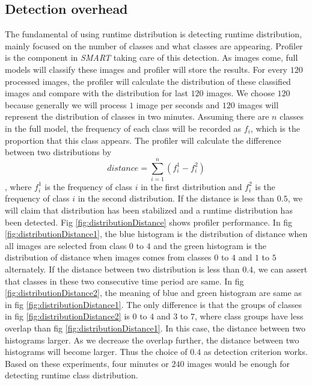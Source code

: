 \documentclass[conference]{IEEEtran}
\begin{document}
\begin{spacing}{0.9}
\subsection{Detection overhead}
The fundamental of using runtime distribution is detecting runtime distribution, mainly focused on the number of classes and what classes are appearing. Profiler is the component in \textit{SMART} taking care of this detection. As images come, full models will classify these images and profiler will store the results. For every $120$ processed images, the profiler will calculate the distribution of these classified images and compare with the distribution for last $120$ images. We choose $120$ because generally we will process $1$ image per seconds and $120$ images will represent the distribution of classes in two minutes. Assuming there are $n$ classes in the full model, the frequency of each class will be recorded as $f_i$, which is the proportion that this class appears. The profiler will calculate the difference between two distributions by 
\begin{equation}
    distance = \sum_{i = 1}^{n}(f_i^1 - f_i^2)
\end{equation}
, where $f_i^1$ is the frequency of class $i$ in the first distribution and $f_i^2$ is the frequency of class $i$ in the second distribution. If the distance is less than $0.5$, we will claim that distribution has been stabilized and a runtime distribution has been detected. Fig \ref{fig:distributionDistance} shows profiler performance. In fig \ref{fig:distributionDistance1}, the blue histogram is the distribution of distance when all images are selected from class $0$ to $4$ and the green histogram is the distribution of distance when images comes from classes $0$ to $4$ and $1$ to $5$ alternately. If the distance between two distribution is less than $0.4$, we can assert that classes in these two consecutive time period are same. In fig \ref{fig:distributionDistance2}, the meaning of blue and green histogram are same as in fig \ref{fig:distributionDistance1}. The only difference is that the groups of classes in fig \ref{fig:distributionDistance2} is $0$ to $4$ and $3$ to $7$, where class groups have less overlap than fig \ref{fig:distributionDistance1}. In this case, the distance between two histograms larger. As we decrease the overlap further, the distance between two histograms will become larger. Thus the choice of $0.4$ as detection criterion works. Based on these experiments, four minutes or $240$ images would be enough for detecting runtime class distribution.









\end{spacing}
\end{document}
